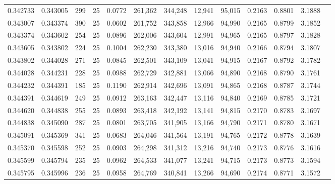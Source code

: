 \begin{tabular}{rrrrrrrrrrrrr}
0.342733 & 0.343005 &   299 &  25 &                                     0.0772 & 261,362 & 344,248 &  12,941 &  95,015 & 0.2163 & 0.8801 & 3.1888 \\
0.343007 & 0.343374 &   390 &  25 &                                     0.0602 & 261,752 & 343,858 &  12,966 &  94,990 & 0.2165 & 0.8799 & 3.1852 \\
0.343374 & 0.343602 &   254 &  25 &                                     0.0896 & 262,006 & 343,604 &  12,991 &  94,965 & 0.2165 & 0.8797 & 3.1828 \\
0.343605 & 0.343802 &   224 &  25 &                                     0.1004 & 262,230 & 343,380 &  13,016 &  94,940 & 0.2166 & 0.8794 & 3.1807 \\
0.343802 & 0.344028 &   271 &  25 &                                     0.0845 & 262,501 & 343,109 &  13,041 &  94,915 & 0.2167 & 0.8792 & 3.1782 \\
0.344028 & 0.344231 &   228 &  25 &                                     0.0988 & 262,729 & 342,881 &  13,066 &  94,890 & 0.2168 & 0.8790 & 3.1761 \\
0.344232 & 0.344391 &   185 &  25 &                                     0.1190 & 262,914 & 342,696 &  13,091 &  94,865 & 0.2168 & 0.8787 & 3.1744 \\
0.344391 & 0.344619 &   249 &  25 &                                     0.0912 & 263,163 & 342,447 &  13,116 &  94,840 & 0.2169 & 0.8785 & 3.1721 \\
0.344620 & 0.344838 &   255 &  25 &                                     0.0893 & 263,418 & 342,192 &  13,141 &  94,815 & 0.2170 & 0.8783 & 3.1697 \\
0.344838 & 0.345090 &   287 &  25 &                                     0.0801 & 263,705 & 341,905 &  13,166 &  94,790 & 0.2171 & 0.8780 & 3.1671 \\
0.345091 & 0.345369 &   341 &  25 &                                     0.0683 & 264,046 & 341,564 &  13,191 &  94,765 & 0.2172 & 0.8778 & 3.1639 \\
0.345370 & 0.345598 &   252 &  25 &                                     0.0903 & 264,298 & 341,312 &  13,216 &  94,740 & 0.2173 & 0.8776 & 3.1616 \\
0.345599 & 0.345794 &   235 &  25 &                                     0.0962 & 264,533 & 341,077 &  13,241 &  94,715 & 0.2173 & 0.8773 & 3.1594 \\
0.345795 & 0.345996 &   236 &  25 &                                     0.0958 & 264,769 & 340,841 &  13,266 &  94,690 & 0.2174 & 0.8771 & 3.1572 \\

\end{tabular}
